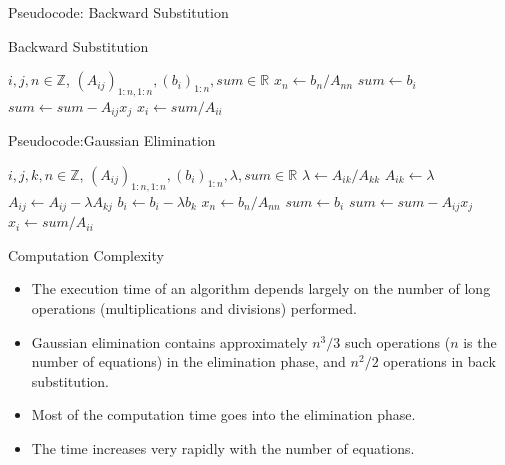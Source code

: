 \documentclass{beamer}
\newcommand{\beforeverb}{\footnotesize}
\newcommand{\afterverb}{\normalsize}
\begin{document}
\begin{frame}{Pseudocode: Backward Substitution}
\begin{block}{Backward Substitution}
\beforeverb
\begin{algorithmic}[1]
\State  $i, j, n \in \mathbb{Z}$, $(A_{ij})_{1:n,1:n}, (b_i)_{1:n}, sum \in \mathbb{R}$
\State $x_n \gets b_n/A_{nn}$
\State $ sum \gets b_i$
\State $sum \gets sum -A_{ij} x_j$
\EndFor
\State $x_i \gets sum/A_{ii}$
\EndFor
\end{algorithmic}
\afterverb
\end{block}
\end{frame}
\begin{frame}{Pseudocode:Gaussian Elimination}

\scriptsize
\begin{algorithmic}[1]
\State  $i, j, k ,n \in \mathbb{Z}$, $(A_{ij})_{1:n,1:n}, (b_i)_{1:n}, \lambda, sum \in \mathbb{R}$
\State $\lambda \gets A_{ik}/A_{kk}$
\State $A_{ik}\gets \lambda$
\State $A_{ij} \gets A_{ij} -\lambda A_{kj} $
\EndFor
\State $b_i \gets b_i-\lambda b_k$
\EndFor
\EndFor
\State $x_n \gets b_n/A_{nn}$
\State $ sum \gets b_i$
\State $sum \gets sum -A_{ij} x_j$
\EndFor
\State $x_i \gets sum/A_{ii}$
\EndFor
\EndProcedure
\end{algorithmic}
\afterverb

\end{frame}

\begin{frame}{Computation Complexity}
\begin{itemize}
\item The execution time of an algorithm depends largely on the \alert{number of long operations} (multiplications and divisions) performed. 
\item  Gaussian elimination contains approximately $n^3/3$ such operations ($n$ is the number of equations) in the elimination phase, and $n^2/2$ operations in back substitution. 
\item Most of the computation time goes into the \alert{elimination phase}. 
\item The time increases very rapidly with the number of equations.
\end{itemize}
\end{frame}
\end{document}
